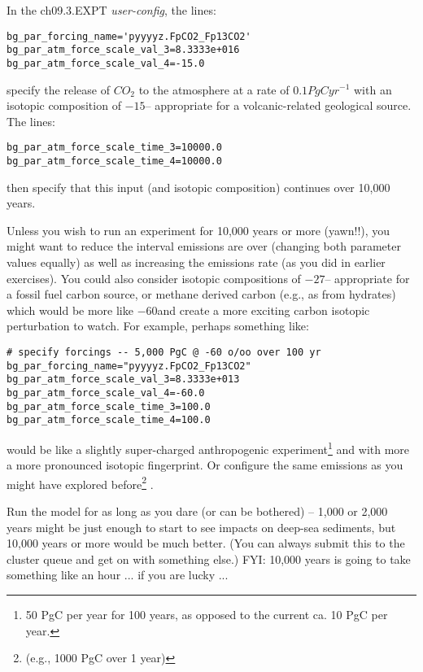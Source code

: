 \vspace{1mm}
In the \textsf{\footnotesize ch09.3.EXPT} \textit{user-config}, the lines:
\vspace{-2mm}\small\begin{verbatim}
bg_par_forcing_name='pyyyyz.FpCO2_Fp13CO2'
bg_par_atm_force_scale_val_3=8.3333e+016
bg_par_atm_force_scale_val_4=-15.0
\end{verbatim}\normalsize\vspace{-2mm}
specify the release of \(CO_{2}\) to the atmosphere at a rate of \(0.1 PgC yr^{-1}\) with an isotopic composition of \(-15\)\permille -- appropriate for a volcanic-related geological source. The lines:
\vspace{-2mm}\small\begin{verbatim}
bg_par_atm_force_scale_time_3=10000.0
bg_par_atm_force_scale_time_4=10000.0
\end{verbatim}\normalsize\vspace{-2mm}
then specify that this input (and isotopic composition) continues over 10,000 years.

\vspace{1mm}
Unless you wish to run an experiment for 10,000 years or more (yawn!!), you might want to reduce the interval emissions are over (changing both parameter values equally) as well as increasing the emissions rate (as you did in earlier exercises). You could also consider isotopic compositions of \(-27\)\permille -- appropriate for a fossil fuel carbon source, or methane derived carbon (e.g., as from hydrates) which would be more like \(-60\)\permille and create a more exciting carbon isotopic perturbation to watch. For example, perhaps something like:
\vspace{-2mm}\small\begin{verbatim}
# specify forcings -- 5,000 PgC @ -60 o/oo over 100 yr
bg_par_forcing_name="pyyyyz.FpCO2_Fp13CO2"
bg_par_atm_force_scale_val_3=8.3333e+013
bg_par_atm_force_scale_val_4=-60.0
bg_par_atm_force_scale_time_3=100.0
bg_par_atm_force_scale_time_4=100.0
\end{verbatim}\normalsize\vspace{-2mm}
would be like a slightly super-charged anthropogenic experiment\footnote{50 PgC per year for 100 years, as opposed to the current ca. 10 PgC per year.} and with more a more pronounced isotopic fingerprint. Or configure the same emissions as you might have explored before\footnote{(e.g., 1000 PgC over 1 year)} .

\vspace{1mm}
Run the model for as long as you dare (or can be bothered) – 1,000 or 2,000 years might be just enough  to start to see impacts on deep-sea sediments, but 10,000 years or more would be much better. (You can always submit this to the cluster queue and get on with something else.) FYI: 10,000 years is going to take something like an hour ... if you are lucky ...

